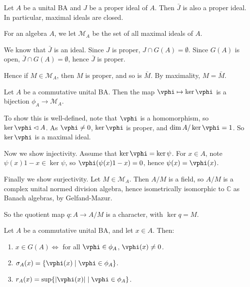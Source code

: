 \documentclass[12pt]{article}
\begin{document}
\begin{lemma}
	Let $A$ be a unital BA and $J$ be a proper ideal of $A$. Then $\bar J$ is also a proper ideal. In particular, maximal ideals are closed.
\end{lemma}

For an algebra $A$, we let $\mathcal{M}_A$ be the set of all maximal ideals of $A$.

\begin{proofbox}
	We know that $\bar J$ is an ideal. Since $J$ is proper, $J \cap G(A) = \emptyset$. Since $G(A)$ is open, $\bar J \cap G(A) = \emptyset$, hence $\bar J$ is proper.

	Hence if $M \in \mathcal{M}_A$, then $M$ is proper, and so is $\bar M$. By maximality, $M = \bar M$.
\end{proofbox}

\begin{theorem}
	Let $A$ be a commutative unital BA. Then the map $\vphi \mapsto \ker \vphi$ is a bijection $\phi_A \to \mathcal{M}_A$.
\end{theorem}

\begin{proofbox}
	To show this is well-defined, note that $\vphi$ is a homomorphism, so $\ker \vphi \lhd A$. As $\vphi \neq 0$, $\ker \vphi$ is proper, and $\dim A / \ker \vphi = 1$. So $\ker \vphi$ is a maximal ideal.

	Now we show injectivity. Assume that $\ker \vphi = \ker \psi$. For $x \in A$, note $\psi(x) 1 - x \in \ker \psi$, so $\vphi(\psi(x) 1 - x) = 0$, hence $\psi(x) = \vphi(x)$.

	Finally we show surjectivity. Let $M \in \mathcal{M}_A$. Then $A / M$ is a field, so $A/M$ is a complex unital normed division algebra, hence isometrically isomorphic to $\mathbb{C}$ as Banach algebras, by Gelfand-Mazur.

	So the quotient map $q : A \to A/M$ is a character, with $\ker q = M$.
\end{proofbox}

\begin{corollary}
	Let $A$ be a commutative unital BA, and let $x \in A$. Then:
	\begin{enumerate}[\normalfont(i)]
		\item $x \in G(A) \iff$ for all $\vphi \in \phi_A$, $\vphi(x) \neq 0$.
		\item $\sigma_A(x) = \{\vphi(x) \mid \vphi \in \phi_A\}$.
		\item $r_A(x) = \sup\{|\vphi(x)| \mid \vphi \in \phi_A\}$.
	\end{enumerate}	
\end{corollary}
\end{document}

